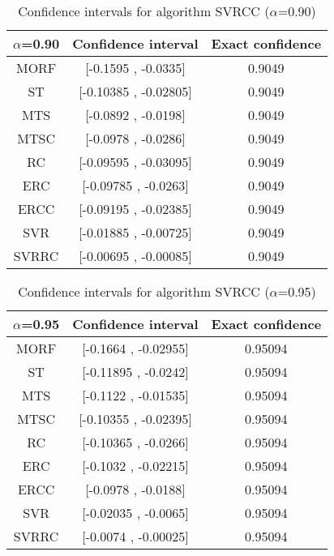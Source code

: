 \documentclass[a4paper,10pt]{article}
\begin{document}
\begin{table}[!htp]
\centering\small
\begin{tabular}{
|c|c|c|}
\hline
 $\alpha$=0.90 & Confidence interval & Exact confidence \\ \hline 
MORF & [-0.1595 , -0.0335] & 0.9049\\ \hline 
ST & [-0.10385 , -0.02805] & 0.9049\\ \hline 
MTS & [-0.0892 , -0.0198] & 0.9049\\ \hline 
MTSC & [-0.0978 , -0.0286] & 0.9049\\ \hline 
RC & [-0.09595 , -0.03095] & 0.9049\\ \hline 
ERC & [-0.09785 , -0.0263] & 0.9049\\ \hline 
ERCC & [-0.09195 , -0.02385] & 0.9049\\ \hline 
SVR & [-0.01885 , -0.00725] & 0.9049\\ \hline 
SVRRC & [-0.00695 , -0.00085] & 0.9049\\ \hline 

\end{tabular}
\caption{Confidence intervals for algorithm SVRCC ($\alpha$=0.90)}
\end{table}
\begin{table}[!htp]
\centering\small
\begin{tabular}{
|c|c|c|}
\hline
 $\alpha$=0.95 & Confidence interval & Exact confidence \\ \hline 
MORF & [-0.1664 , -0.02955] & 0.95094\\ \hline 
ST & [-0.11895 , -0.0242] & 0.95094\\ \hline 
MTS & [-0.1122 , -0.01535] & 0.95094\\ \hline 
MTSC & [-0.10355 , -0.02395] & 0.95094\\ \hline 
RC & [-0.10365 , -0.0266] & 0.95094\\ \hline 
ERC & [-0.1032 , -0.02215] & 0.95094\\ \hline 
ERCC & [-0.0978 , -0.0188] & 0.95094\\ \hline 
SVR & [-0.02035 , -0.0065] & 0.95094\\ \hline 
SVRRC & [-0.0074 , -0.00025] & 0.95094\\ \hline 

\end{tabular}
\caption{Confidence intervals for algorithm SVRCC ($\alpha$=0.95)}
\end{table}

 \clearpage 
\end{document}
